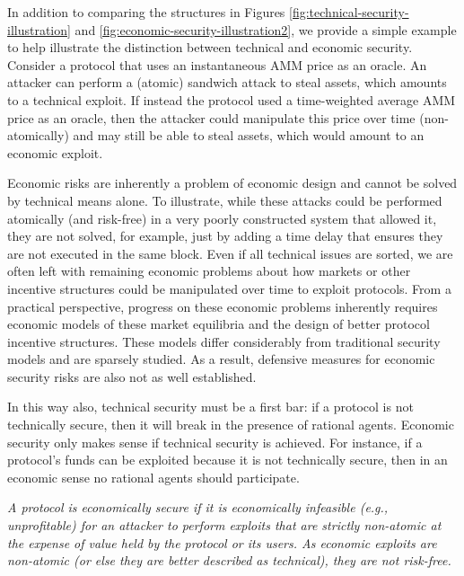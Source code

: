 In addition to comparing the structures in Figures \ref{fig:technical-security-illustration} and \ref{fig:economic-security-illustration2}, we provide a simple example to help illustrate the distinction between technical and economic security. Consider a protocol that uses an instantaneous AMM price as an oracle. An attacker can perform a (atomic) sandwich attack to steal assets, which amounts to a technical exploit. If instead the protocol used a time-weighted average AMM price as an oracle, then the attacker could manipulate this price over time (non-atomically) and may still be able to steal assets, which would amount to an economic exploit.

Economic risks are inherently a problem of economic design and cannot be solved by technical means alone. To illustrate, while these attacks could be performed atomically (and risk-free) in a very poorly constructed system that allowed it, they are not solved, for example, just by adding a time delay that ensures they are not executed in the same block. Even if all technical issues are sorted, we are often left with remaining economic problems about how markets or other incentive structures could be manipulated over time to exploit protocols.
From a practical perspective, progress on these economic problems inherently requires economic models of these market equilibria and the design of better protocol incentive structures. These models differ considerably from traditional security models and are sparsely studied. As a result, defensive measures for economic security risks are also not as well established.

In this way also, technical security must be a first bar: if a protocol is not technically secure, then it will break in the presence of rational agents. Economic security only makes sense if technical security is achieved. For instance, if a protocol's funds can be exploited because it is not technically secure, then in an economic sense no rational agents should participate.


\begin{tcolorbox}[boxsep=1pt,left=2pt,right=2pt,top=2pt,bottom=2pt, title=Economic Security]
  \emph{A protocol is economically secure if it is economically infeasible (e.g., unprofitable) for an attacker to perform exploits that are strictly non-atomic at the expense of value held by the protocol or its users. As economic exploits are non-atomic (or else they are better described as technical), they are not risk-free.}
\end{tcolorbox}
